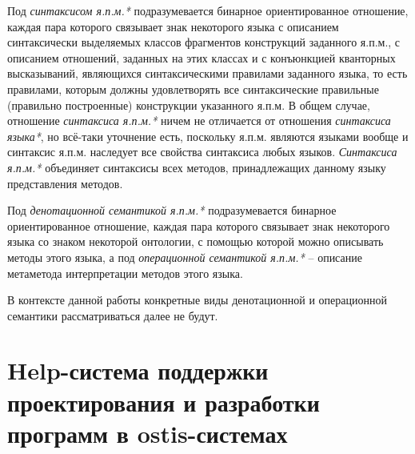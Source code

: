 Под \textit{синтаксисом я.п.м.*} подразумевается бинарное ориентированное отношение, каждая пара которого связывает знак некоторого языка с описанием синтаксически выделяемых классов фрагментов конструкций заданного я.п.м., с описанием отношений, заданных на этих классах и с конъюнкцией кванторных высказываний, являющихся синтаксическими правилами заданного языка, то есть правилами, которым должны удовлетворять все синтаксические правильные (правильно построенные) конструкции указанного я.п.м. В общем случае, отношение \textit{синтаксиса я.п.м.*} ничем не отличается от отношения \textit{синтаксиса языка*}, но всё-таки уточнение есть, поскольку я.п.м. являются языками вообще и синтаксис я.п.м. наследует все свойства синтаксиса любых языков. \textit{Синтаксиса я.п.м.*} объединяет синтаксисы всех методов, принадлежащих данному языку представления методов.

Под \textit{денотационной семантикой я.п.м.*} подразумевается бинарное ориентированное отношение, каждая пара которого связывает знак некоторого языка со знаком некоторой онтологии, с помощью которой можно описывать методы этого языка, а под \textit{операционной семантикой я.п.м.*} -- описание метаметода интерпретации методов этого языка.

В контексте данной работы конкретные виды денотационной и операционной семантики рассматриваться далее не будут.

\section{Help-система поддержки проектирования и разработки программ в ostis-системах}
\label{sec_programs_help_system}

